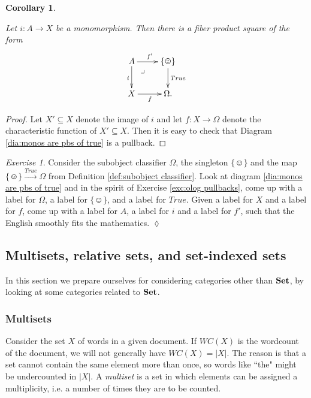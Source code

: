 \documentclass{book}
\makeatletter
\def\singleton{\{\smiley\}}
\def\to{\rightarrow}
\def\taking{\colon}
\def\ss{\subseteq}
\def\ullimit{\ar@{}[rd]|(.3)*+{\lrcorner}}
\newcommand{\To}[1]{\xrightarrow{#1}}
\def\Set{{\bf Set}}
\newtheorem{corollary}[subsubsection]{Corollary}
\theoremstyle{remark}
\newtheorem{exc}[subsubsection]{Exercise}
\newenvironment{exercise}{\begin{exc}}{\hspace*{\fill}$\lozenge$\end{exc}}
\theoremstyle{definition}
\makeatother
\begin{document}
\begin{corollary}\label{cor:monos are pullbacks of true}

Let $i\taking A\to X$ be a monomorphism. Then there is a fiber product square of the form 
\begin{align}\label{dia:monos are pbs of true}
\xymatrix{A\ar[r]^{f'}\ar[d]_i\ullimit&\singleton\ar[d]^{True}\\X\ar[r]_f&\Omega.}
\end{align}

\end{corollary}

\begin{proof}

Let $X'\ss X$ denote the image of $i$ and let $f\taking X\to\Omega$ denote the characteristic function of $X'\ss X$. Then it is easy to check that Diagram \ref{dia:monos are pbs of true} is a pullback.

\end{proof}

\begin{exercise}
Consider the subobject classifier $\Omega$, the singleton $\singleton$ and the map $\singleton\To{True}\Omega$ from Definition \ref{def:subobject classifier}. Look at diagram \ref{dia:monos are pbs of true} and in the spirit of Exercise \ref{exc:olog pullbacks}, come up with a label for $\Omega$, a label for $\singleton$, and a label for $True$. Given a label for $X$ and a label for $f$, come up with a label for $A$, a label for $i$ and a label for $f'$, such that the English smoothly fits the mathematics.
\end{exercise}


\subsection{Multisets, relative sets, and set-indexed sets}

In this section we prepare ourselves for considering categories other than $\Set$, by looking at some categories related to $\Set$. 


\subsubsection{Multisets}

Consider the set $X$ of words in a given document. If $WC(X)$ is the wordcount of the document, we will not generally have $WC(X)=|X|$. The reason is that a set cannot contain the same element more than once, so words like ``the" might be undercounted in $|X|$. A {\em multiset} is a set in which elements can be assigned a multiplicity, i.e. a number of times they are to be counted. 
\end{document}
